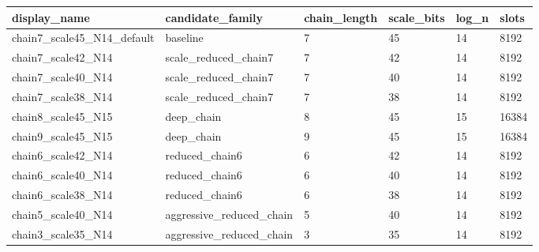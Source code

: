 \begin{tabular}{llllll}
\toprule
display_name & candidate_family & chain_length & scale_bits & log_n & slots \\
\midrule
chain7\_scale45\_N14\_default & baseline & 7 & 45 & 14 & 8192 \\
chain7\_scale42\_N14 & scale\_reduced\_chain7 & 7 & 42 & 14 & 8192 \\
chain7\_scale40\_N14 & scale\_reduced\_chain7 & 7 & 40 & 14 & 8192 \\
chain7\_scale38\_N14 & scale\_reduced\_chain7 & 7 & 38 & 14 & 8192 \\
chain8\_scale45\_N15 & deep\_chain & 8 & 45 & 15 & 16384 \\
chain9\_scale45\_N15 & deep\_chain & 9 & 45 & 15 & 16384 \\
chain6\_scale42\_N14 & reduced\_chain6 & 6 & 42 & 14 & 8192 \\
chain6\_scale40\_N14 & reduced\_chain6 & 6 & 40 & 14 & 8192 \\
chain6\_scale38\_N14 & reduced\_chain6 & 6 & 38 & 14 & 8192 \\
chain5\_scale40\_N14 & aggressive\_reduced\_chain & 5 & 40 & 14 & 8192 \\
chain3\_scale35\_N14 & aggressive\_reduced\_chain & 3 & 35 & 14 & 8192 \\
\bottomrule
\end{tabular}

